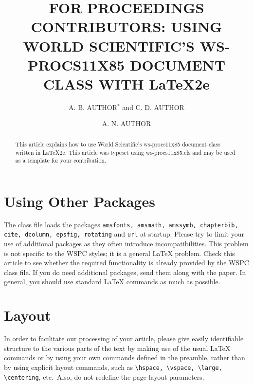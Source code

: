 \documentclass{ws-procs11x85}
\begin{document}
\title{FOR PROCEEDINGS CONTRIBUTORS: USING WORLD SCIENTIFIC'S WS-PROCS11X85 DOCUMENT CLASS WITH \LaTeX2e}

\author{A. B. AUTHOR$^*$ and C. D. AUTHOR}

\address{University Department, University Name,\\
City, State ZIP/Zone, Country\\
$^*$E-mail: ab\_author@university.com\\
www.university\_name.edu}

\author{A. N. AUTHOR}

\address{Group, Laboratory, Street,\\
City, State ZIP/Zone, Country\\
E-mail: an\_author@laboratory.com}

\begin{abstract}
This article explains how to use World Scientific's ws-procs11x85
document class written in \LaTeX2e. This article was typeset using
ws-procs11x85.cls and may be used as a template for your contribution.
\end{abstract}


\bodymatter

\section{Using Other Packages}\label{aba:sec1}
The class file loads the packages {\tt amsfonts, amsmath, amssymb,
chapterbib, cite, dcolumn, epsfig, rotating} and {\tt url} at
startup. Please try to limit your use of additional packages as they
often introduce incompatibilities. This problem is not specific to
the WSPC styles; it is a general \LaTeX{} problem. Check this
article to see whether the required functionality is already
provided by the WSPC class file. If you do need additional packages,
send them along with the paper. In general, you should use standard
\LaTeX{} commands as much as possible.

\section{Layout}
In order to facilitate our processing of your article, please give
easily identifiable structure to the various parts of the text by
making use of the usual \LaTeX{} commands or by using your own commands
defined in the preamble, rather than by using explicit layout
commands, such as \verb|\hspace, \vspace, \large, \centering|,
etc.~Also, do not redefine the page-layout parameters.
\end{document}

